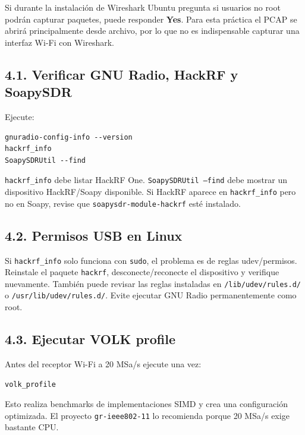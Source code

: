 Si durante la instalación de Wireshark Ubuntu pregunta si usuarios no root podrán capturar paquetes, puede responder \textbf{Yes}. Para esta práctica el PCAP se abrirá principalmente desde archivo, por lo que no es indispensable capturar una interfaz Wi-Fi con Wireshark.

\subsection{4.1. Verificar GNU Radio, HackRF y SoapySDR}

Ejecute:

\begin{lstlisting}
gnuradio-config-info --version
hackrf_info
SoapySDRUtil --find
\end{lstlisting}

\begin{esperado}
\texttt{hackrf\_info} debe listar HackRF One. \texttt{SoapySDRUtil --find} debe mostrar un dispositivo HackRF/Soapy disponible. Si HackRF aparece en \texttt{hackrf\_info} pero no en Soapy, revise que \texttt{soapysdr-module-hackrf} esté instalado.
\end{esperado}

\subsection{4.2. Permisos USB en Linux}

Si \texttt{hackrf\_info} solo funciona con \texttt{sudo}, el problema es de reglas udev/permisos. Reinstale el paquete \texttt{hackrf}, desconecte/reconecte el dispositivo y verifique nuevamente. También puede revisar las reglas instaladas en \texttt{/lib/udev/rules.d/} o \texttt{/usr/lib/udev/rules.d/}. Evite ejecutar GNU Radio permanentemente como root.

\subsection{4.3. Ejecutar VOLK profile}

Antes del receptor Wi-Fi a 20 MSa/s ejecute una vez:

\begin{lstlisting}
volk_profile
\end{lstlisting}

Esto realiza benchmarks de implementaciones SIMD y crea una configuración optimizada. El proyecto \texttt{gr-ieee802-11} lo recomienda porque 20 MSa/s exige bastante CPU.

\clearpage
